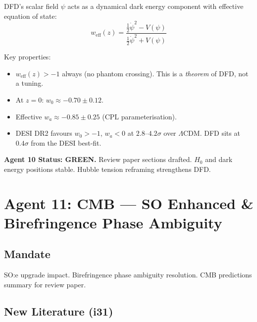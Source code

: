 \documentclass[11pt,a4paper]{article}
\newcommand{\GREEN}{\textcolor{dfdgreen}{\textbf{GREEN}}}
\begin{document}
DFD's scalar field $\psi$ acts as a dynamical dark energy component with effective equation of state:
\begin{equation}
w_\mathrm{eff}(z) = \frac{\frac{1}{2}\dot{\psi}^2 - V(\psi)}{\frac{1}{2}\dot{\psi}^2 + V(\psi)}
\end{equation}

Key properties:
\begin{itemize}
\item $w_\mathrm{eff}(z) > -1$ always (no phantom crossing). This is a \emph{theorem} of DFD, not a tuning.
\item At $z = 0$: $w_0 \approx -0.70 \pm 0.12$.
\item Effective $w_a \approx -0.85 \pm 0.25$ (CPL parameterisation).
\item DESI DR2 favours $w_0 > -1$, $w_a < 0$ at $2.8$--$4.2\sigma$ over $\Lambda$CDM. DFD sits at $0.4\sigma$ from the DESI best-fit.
\end{itemize}

\textbf{Agent 10 Status: \GREEN.} Review paper sections drafted. $H_0$ and dark energy positions stable. Hubble tension reframing strengthens DFD.

\section{Agent 11: CMB --- SO Enhanced \& Birefringence Phase Ambiguity}

\subsection{Mandate}
SO:e upgrade impact. Birefringence phase ambiguity resolution. CMB predictions summary for review paper.

\subsection{New Literature (i31)}
\end{document}
